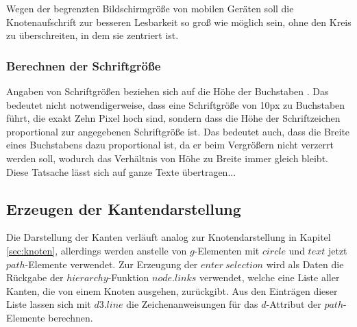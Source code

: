 Wegen der begrenzten Bildschirmgröße von mobilen Geräten soll die Knotenaufschrift zur besseren Lesbarkeit so groß wie möglich sein, ohne den Kreis zu überschreiten, in dem sie zentriert ist.

\subsubsection*{Berechnen der Schriftgröße}
Angaben von Schriftgrößen beziehen sich auf die Höhe der Buchstaben . Das bedeutet nicht notwendigerweise, dass eine Schriftgröße von 10px zu Buchstaben führt, die exakt Zehn Pixel hoch sind, sondern dass die Höhe der Schriftzeichen proportional zur angegebenen Schriftgröße ist. Das bedeutet auch, dass die Breite eines Buchstabens dazu proportional ist, da er beim Vergrößern nicht verzerrt werden soll, wodurch das Verhältnis von Höhe zu Breite immer gleich bleibt. Diese Tatsache lässt sich auf ganze Texte übertragen...

\subsection{Erzeugen der Kantendarstellung}\label{sec:kanten}
Die Darstellung der Kanten verläuft analog zur Knotendarstellung in Kapitel \ref{sec:knoten}, allerdings werden anstelle von $g$-Elementen mit $circle$ und $text$ jetzt $path$-Elemente verwendet. Zur Erzeugung der $enter\ selection$ wird als Daten die Rückgabe der $hierarchy$-Funktion $node.links$ verwendet, welche eine Liste aller Kanten, die von einem Knoten ausgehen, zurückgibt. Aus den Einträgen dieser Liste lassen sich mit $d3.line$ die Zeichenanweisungen für das $d$-Attribut der $path$-Elemente berechnen.

